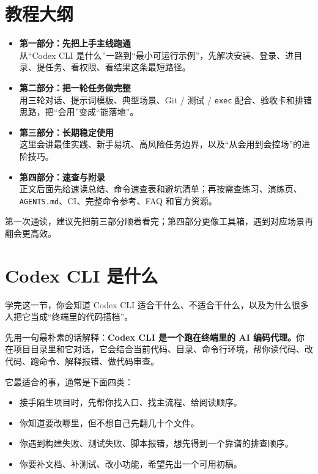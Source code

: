 \documentclass[UTF8,a4paper,12pt]{ctexart}
\begin{document}
\tableofcontents
\newpage

\section*{教程大纲}
\begin{itemize}
  \item \textbf{第一部分：先把上手主线跑通}\\
  从“Codex CLI 是什么”一路到“最小可运行示例”，先解决安装、登录、进目录、提任务、看权限、看结果这条最短路径。
  \item \textbf{第二部分：把一轮任务做完整}\\
  用三轮对话、提示词模板、典型场景、Git / 测试 / \texttt{exec} 配合、验收卡和排错思路，把“会用”变成“能落地”。
  \item \textbf{第三部分：长期稳定使用}\\
  这里会讲最佳实践、新手易坑、高风险任务边界，以及“从会用到会控场”的进阶技巧。
  \item \textbf{第四部分：速查与附录}\\
  正文后面先给速读总结、命令速查表和避坑清单；再按需查练习、演练页、\texttt{AGENTS.md}、CI、完整命令参考、FAQ 和官方资源。
\end{itemize}

\begin{tipbox}
第一次通读，建议先把前三部分顺着看完；第四部分更像工具箱，遇到对应场景再翻会更高效。
\end{tipbox}

\newpage
\section{Codex CLI 是什么}

\begin{learnbox}
学完这一节，你会知道 Codex CLI 适合干什么、不适合干什么，以及为什么很多人把它当成“终端里的代码搭档”。
\end{learnbox}

先用一句最朴素的话解释：\textbf{Codex CLI 是一个跑在终端里的 AI 编码代理。}你在项目目录里和它对话，它会结合当前代码、目录、命令行环境，帮你读代码、改代码、跑命令、解释报错、做代码审查。

它最适合的事，通常是下面四类：
\begin{itemize}
  \item 接手陌生项目时，先帮你找入口、找主流程、给阅读顺序。
  \item 你知道要改哪里，但不想自己先翻几十个文件。
  \item 你遇到构建失败、测试失败、脚本报错，想先得到一个靠谱的排查顺序。
  \item 你要补文档、补测试、改小功能，希望先出一个可用初稿。
\end{itemize}
\end{document}
